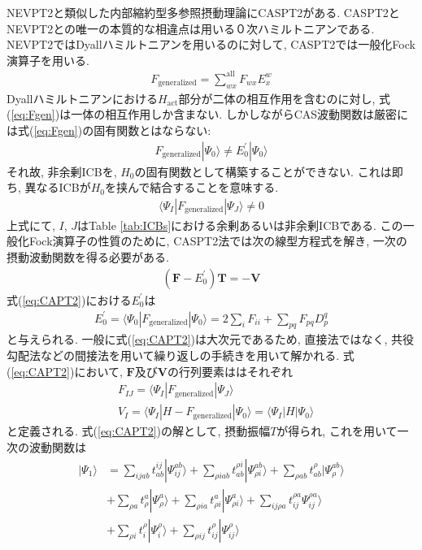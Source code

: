 \documentclass[11pt,pra,aps]{revtex4}
\begin{document}
NEVPT2と類似した内部縮約型多参照摂動理論にCASPT2がある. \cite{doi:10.1021/j100377a012,doi:10.1063/1.462209} CASPT2とNEVPT2との唯一の本質的な相違点は用いる０次ハミルトニアンである. NEVPT2ではDyallハミルトニアンを用いるのに対して, CASPT2では一般化Fock演算子を用いる. 
\begin{align}
  F_\text{generalized}=\sum_{wx}^\text{all} F_{wx} E^w_x \label{eq:Fgen}
\end{align}
Dyallハミルトニアンにおける$H_\text{act}$部分が二体の相互作用を含むのに対し, 式(\ref{eq:Fgen})は一体の相互作用しか含まない. しかしながらCAS波動関数は厳密には式(\ref{eq:Fgen})の固有関数とはならない:
\begin{align}
  F_\text{generalized}|\Psi_0\rangle \neq E_0^{'} |\Psi_0\rangle \label{eq:Fgen-eig}
\end{align}
それ故, 非余剰ICBを, $H_0$の固有関数として構築することができない. これは即ち, 異なるICBが$H_0$を挟んで結合することを意味する. 
\begin{align}
  \langle \Psi_I|F_\text{generalized}|\Psi_J\rangle\neq0 \label{eq:coupling}
\end{align}
上式にて, $I$, $J$はTable \ref{tab:ICBs}における余剰あるいは非余剰ICBである. この一般化Fock演算子の性質のために, CASPT2法では次の線型方程式を解き, 一次の摂動波動関数を得る必要がある. 
\begin{align}
  \left(\mathbf{F}-E^{'}_0\right)\mathbf{T}=-\mathbf{V} \label{eq:CAPT2}
\end{align}
式(\ref{eq:CAPT2})における$E_0^{'}$は
\begin{align}
  E_0^{'}=\langle\Psi_0|F_\text{generalized}|\Psi_0\rangle=2\sum_i F_{ii}+\sum_{pq} F_{pq} D_p^q
\end{align}
と与えられる. 一般に式(\ref{eq:CAPT2})は大次元であるため, 直接法ではなく, 共役勾配法などの間接法を用いて繰り返しの手続きを用いて解かれる. 式(\ref{eq:CAPT2})において, $\mathbf{F}$及び$\mathbf{V}$の行列要素ははそれぞれ
\begin{align}
  &F_{IJ}=\langle\Psi_I|F_\text{generalized}|\Psi_J\rangle \label{eq:fij} \\
  &V_{I} =\langle\Psi_I|H-F_\text{generalized}|\Psi_0\rangle = \langle\Psi_I|H|\Psi_0\rangle
\end{align}
と定義される. 式(\ref{eq:CAPT2})の解として, 摂動振幅$T$が得られ, これを用いて一次の波動関数は
\begin{align}
  |\Psi_1\rangle&=\sum_{ijab} t_{ab}^{ij} |\Psi_{ij}^{ab}\rangle+\sum_{\rho iab} t_{ab}^{\rho i} |\Psi_{\rho i}^{ab}\rangle+\sum_{\rho ab} t_{ab}^{\rho} |\Psi_{\rho}^{ab}\rangle \nonumber \\
  &+\sum_{\rho a} t_{\rho}^a |\Psi_{\rho}^{a}\rangle +\sum_{\rho ia} t_{\rho i}^a |\Psi_{\rho i}^{a}\rangle + \sum_{ij\rho a} t_{ij}^{\rho a} \Psi_{ij}^{\rho a}\rangle \nonumber \\
  &+\sum_{\rho i} t_i^{\rho} |\Psi_i^{\rho}\rangle+\sum_{\rho ij} t_{ij}^{\rho} |\Psi_{ij}^{\rho}\rangle
\end{align}
\end{document}
